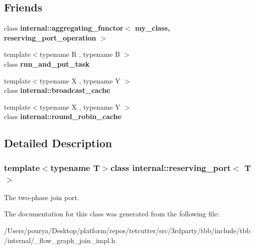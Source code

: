 \subsection*{Friends}
\begin{DoxyCompactItemize}
\item 
\hypertarget{classinternal_1_1reserving__port_a084836e3a676a8a3ebf33c5417a34f83}{}class {\bfseries internal\+::aggregating\+\_\+functor$<$ my\+\_\+class, reserving\+\_\+port\+\_\+operation $>$}\label{classinternal_1_1reserving__port_a084836e3a676a8a3ebf33c5417a34f83}

\item 
\hypertarget{classinternal_1_1reserving__port_abaf9bf74ca5f2854d09f5f07337280eb}{}{\footnotesize template$<$typename R , typename B $>$ }\\class {\bfseries run\+\_\+and\+\_\+put\+\_\+task}\label{classinternal_1_1reserving__port_abaf9bf74ca5f2854d09f5f07337280eb}

\item 
\hypertarget{classinternal_1_1reserving__port_a1360e38efe396058978cf3754ad620f5}{}{\footnotesize template$<$typename X , typename Y $>$ }\\class {\bfseries internal\+::broadcast\+\_\+cache}\label{classinternal_1_1reserving__port_a1360e38efe396058978cf3754ad620f5}

\item 
\hypertarget{classinternal_1_1reserving__port_acbd9ac2610587a99cd7d43344297cc49}{}{\footnotesize template$<$typename X , typename Y $>$ }\\class {\bfseries internal\+::round\+\_\+robin\+\_\+cache}\label{classinternal_1_1reserving__port_acbd9ac2610587a99cd7d43344297cc49}

\end{DoxyCompactItemize}


\subsection{Detailed Description}
\subsubsection*{template$<$typename T$>$class internal\+::reserving\+\_\+port$<$ T $>$}

The two-\/phase join port. 

The documentation for this class was generated from the following file\+:\begin{DoxyCompactItemize}
\item 
/\+Users/pourya/\+Desktop/platform/repos/tetcutter/src/3rdparty/tbb/include/tbb/internal/\+\_\+flow\+\_\+graph\+\_\+join\+\_\+impl.\+h\end{DoxyCompactItemize}
